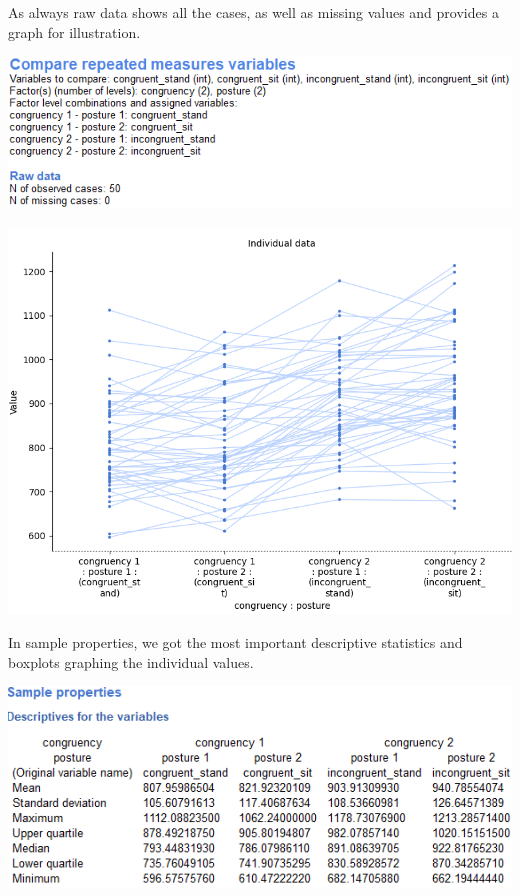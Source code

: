\documentclass[
]{book}
\begin{document}
As always raw data shows all the cases, as well as missing values and provides a graph for illustration.

\includegraphics{img/ch10/10.5CRMV_raw.png}

\includegraphics{img/ch10/10.5CRMV_plot.png}

In sample properties, we got the most important descriptive statistics and boxplots graphing the individual values.

\includegraphics{img/ch10/10.5CRMV_descriptives.png}
\end{document}
